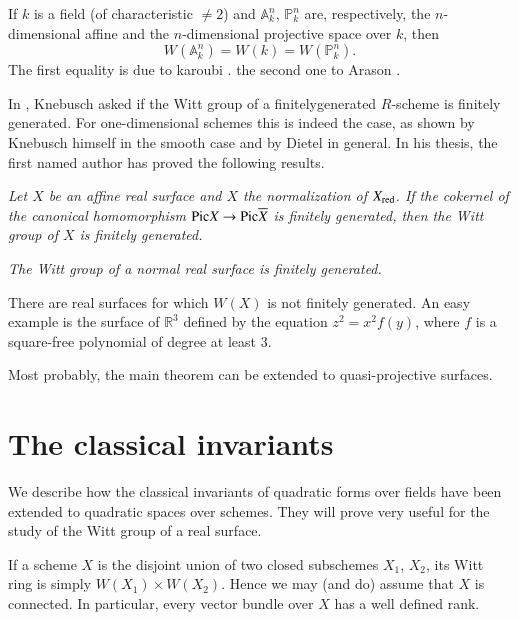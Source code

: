 \begin{EXPS}
If $k$ is a field (of characteristic $\neq 2$) and $\mathbb{A}^{n}_k$, $\mathbb{P}^{n}_k$ are, respectively, the $n$-dimensional affine and the $n$-dimensional projective space over $k$, then 
$$
W\left(\mathbb{A}^{n}_k\right)=W(k)=W\left(\mathbb{P}^{n}_k\right).
$$
The first equality is due to karoubi \cite{key9}. the second one to Arason \cite{key1}. 

In \cite{key11}, Knebusch asked if the Witt group of a finitely\pageoriginale generated $R$-scheme is finitely generated. For one-dimensional schemes this is indeed the case, as shown by Knebusch himself in the smooth case and by Dietel \cite{key5} in general. In his thesis, the first named author has proved the following results. 
\end{EXPS}

\begin{TM}
\textit{Let $X$ be an affine real surface and $X$ the normalization of $X_{\mathrm{red}}$. If the cokernel of the canonical homomorphism $\mathrm{Pic} X\to \mathrm{Pic}\\ \overline{X}$ is finitely generated, then the Witt group of $X$ is finitely generated.}
\end{TM}

\begin{corr}
\textit{The Witt group of a normal real surface is finitely generated.}
\end{corr}

\begin{ces}
There are real surfaces for which $W(X)$ is not fini\-tely generated. An easy example is the surface of $\mathbb{R}^{3}$ defined by the equation $z^{2}=x^{2}f(y)$, where $f$ is a square-free polynomial of degree at least $3$.

Most probably, the main theorem can be extended to quasi-projective surfaces.
\end{ces}

\section{The classical invariants}\label{s2}

We describe how the classical invariants of quadratic forms over fields have been extended to quadratic spaces over schemes. They will prove very useful for the study of the Witt group of a real surface. 

If a scheme $X$ is the disjoint union of two closed subschemes $X_1$, $X_2$, its Witt ring is simply $W(X_1)\times W(X_2)$. Hence we may (and do) assume that $X$ is connected. In particular, every vector bundle over $X$ has a well defined rank.  

